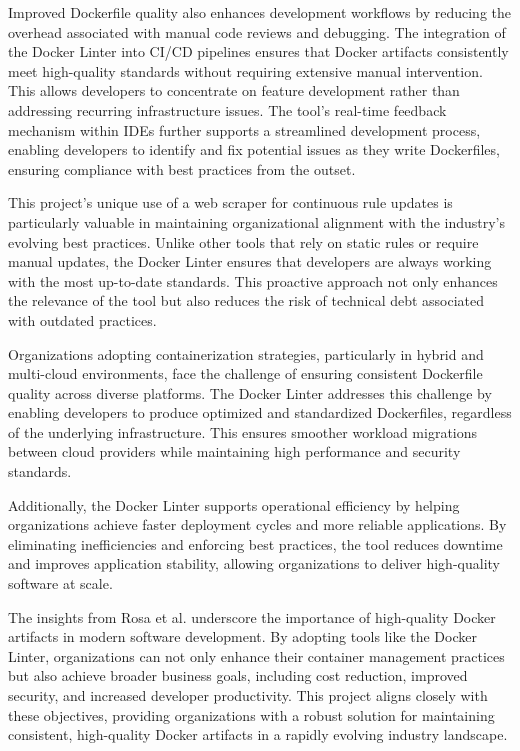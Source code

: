 Improved Dockerfile quality also enhances development workflows by reducing the overhead associated with manual code reviews and debugging. The integration of the Docker Linter into CI/CD pipelines ensures that Docker artifacts consistently meet high-quality standards without requiring extensive manual intervention. This allows developers to concentrate on feature development rather than addressing recurring infrastructure issues. The tool's real-time feedback mechanism within IDEs further supports a streamlined development process, enabling developers to identify and fix potential issues as they write Dockerfiles, ensuring compliance with best practices from the outset.

This project's unique use of a web scraper for continuous rule updates is particularly valuable in maintaining organizational alignment with the industry's evolving best practices. Unlike other tools that rely on static rules or require manual updates, the Docker Linter ensures that developers are always working with the most up-to-date standards. This proactive approach not only enhances the relevance of the tool but also reduces the risk of technical debt associated with outdated practices.

Organizations adopting containerization strategies, particularly in hybrid and multi-cloud environments, face the challenge of ensuring consistent Dockerfile quality across diverse platforms. The Docker Linter addresses this challenge by enabling developers to produce optimized and standardized Dockerfiles, regardless of the underlying infrastructure. This ensures smoother workload migrations between cloud providers while maintaining high performance and security standards.

Additionally, the Docker Linter supports operational efficiency by helping organizations achieve faster deployment cycles and more reliable applications. By eliminating inefficiencies and enforcing best practices, the tool reduces downtime and improves application stability, allowing organizations to deliver high-quality software at scale.

The insights from Rosa et al. underscore the importance of high-quality Docker artifacts in modern software development. By adopting tools like the Docker Linter, organizations can not only enhance their container management practices but also achieve broader business goals, including cost reduction, improved security, and increased developer productivity. This project aligns closely with these objectives, providing organizations with a robust solution for maintaining consistent, high-quality Docker artifacts in a rapidly evolving industry landscape.
